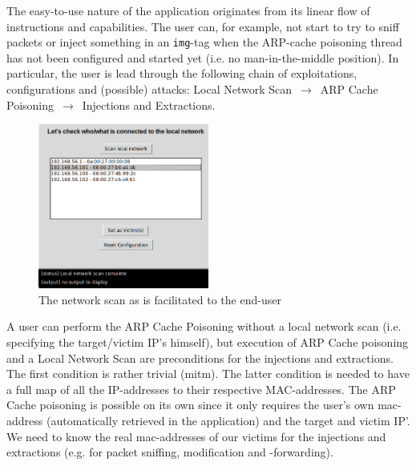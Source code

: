 The easy-to-use nature of the application originates from its linear flow of instructions and capabilities. The user can, for example, not start to try to sniff packets or inject something in an \texttt{img}-tag when the ARP-cache poisoning thread has not been configured and started yet (i.e. no man-in-the-middle position). In particular, the user is lead through the following chain of exploitations, configurations and (possible) attacks: Local Network Scan $\,\to\,$ ARP Cache Poisoning $\,\to\,$ Injections and Extractions.

\begin{figure}[h!]
	\centering
	\includegraphics[width=0.5\textwidth]{img/network_scan.png}
	\caption{
		The network scan as is facilitated to the end-user}
	\label{fig:gui_network_scan}
\end{figure}

A user can perform the ARP Cache Poisoning without a local network scan (i.e. specifying the target/victim IP's himself), but execution of ARP Cache poisoning and a Local Network Scan are  preconditions for the injections and extractions. The first condition is rather trivial (mitm). The latter condition is needed to have a full map of all the IP-addresses to their respective MAC-addresses. The ARP Cache poisoning is possible on its own since it only requires the user's own mac-address (automatically retrieved in the application) and the target and victim IP'. We need to know the real mac-addresses of our victims for the injections and extractions (e.g. for packet sniffing, modification and -forwarding).\\ 

